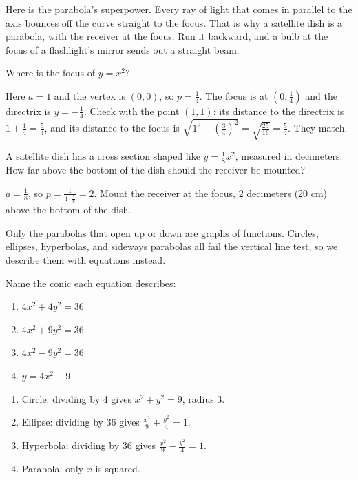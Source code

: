 Here is the parabola's superpower. Every ray of light that comes in
parallel to the axis bounces off the curve straight to the focus. That is
why a satellite dish is a parabola, with the receiver at the focus. Run it
backward, and a bulb at the focus of a flashlight's mirror sends out a
straight beam.

\begin{Worked}
\begin{Problem}
Where is the focus of $y = x^2$?
\end{Problem}
\begin{Solution}
Here $a = 1$ and the vertex is $(0,0)$, so
$p = \frac{1}{4}$. The focus is at $\left(0, \frac{1}{4}\right)$ and the
directrix is $y = -\frac{1}{4}$. Check with the point $(1, 1)$: its
distance to the directrix is $1 + \frac{1}{4} = \frac{5}{4}$, and its
distance to the focus is $\sqrt{1^2 + \left(\frac{3}{4}\right)^2} =
\sqrt{\frac{25}{16}} = \frac{5}{4}$. They match.
\end{Solution}
\end{Worked}

\begin{Exercise}[title={Where does the receiver go?}, label=conic_dish]
A satellite dish has a cross section shaped like $y = \frac{1}{8}x^2$,
measured in decimeters. How far above the bottom of the dish should the
receiver be mounted?
\end{Exercise}
\begin{Answer}[ref=conic_dish]
$a = \frac{1}{8}$, so $p = \frac{1}{4 \cdot \frac{1}{8}} = 2$. Mount the
receiver at the focus, 2 decimeters (20 cm) above the bottom of the dish.
\end{Answer}

Only the parabolas that open up or down are graphs of functions. Circles,
ellipses, hyperbolas, and sideways parabolas all fail the
vertical line test, so we describe them with
equations instead.

\begin{Exercise}[title={Name that conic}, label=conic_name]
Name the conic each equation describes:
\begin{enumerate}
\item $4x^2 + 4y^2 = 36$
\item $4x^2 + 9y^2 = 36$
\item $4x^2 - 9y^2 = 36$
\item $y = 4x^2 - 9$
\end{enumerate}
\end{Exercise}
\begin{Answer}[ref=conic_name]
\begin{enumerate}
\item Circle: dividing by 4 gives $x^2 + y^2 = 9$, radius 3.
\item Ellipse: dividing by 36 gives $\frac{x^2}{9} + \frac{y^2}{4} = 1$.
\item Hyperbola: dividing by 36 gives $\frac{x^2}{9} - \frac{y^2}{4} = 1$.
\item Parabola: only $x$ is squared.
\end{enumerate}
\end{Answer}
